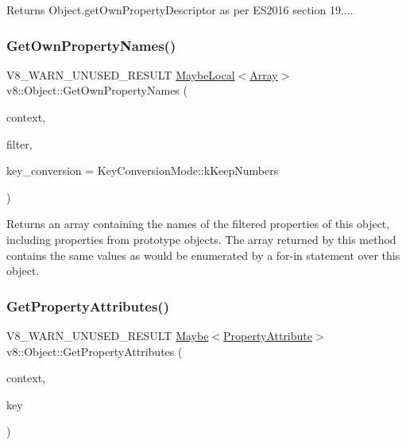 Returns Object.\+get\+Own\+Property\+Descriptor as per E\+S2016 section 19.... \mbox{\label{classv8_1_1Object_a345cc5b8e646c89bdf03b76f60544c91}} 
\subsubsection{\texorpdfstring{Get\+Own\+Property\+Names()}{GetOwnPropertyNames()}}
{\footnotesize\ttfamily V8\+\_\+\+W\+A\+R\+N\+\_\+\+U\+N\+U\+S\+E\+D\+\_\+\+R\+E\+S\+U\+LT \mbox{\hyperlink{classv8_1_1MaybeLocal}{Maybe\+Local}}$<$\mbox{\hyperlink{classv8_1_1Array}{Array}}$>$ v8\+::\+Object\+::\+Get\+Own\+Property\+Names (\begin{DoxyParamCaption}\item[{\mbox{\hyperlink{classv8_1_1Local}{Local}}$<$ \mbox{\hyperlink{classv8_1_1Context}{Context}} $>$}]{context,  }\item[{\mbox{\hyperlink{namespacev8_afbf02b6b1152a3e25d7bde90798209ac}{Property\+Filter}}}]{filter,  }\item[{\mbox{\hyperlink{namespacev8_aa65aeff871614520d8033dead4b34e38}{Key\+Conversion\+Mode}}}]{key\+\_\+conversion = {\ttfamily KeyConversionMode\+:\+:kKeepNumbers} }\end{DoxyParamCaption})}

Returns an array containing the names of the filtered properties of this object, including properties from prototype objects. The array returned by this method contains the same values as would be enumerated by a for-\/in statement over this object. \mbox{\label{classv8_1_1Object_ae5c97a596bcb634c50605a574358a9c6}} 
\subsubsection{\texorpdfstring{Get\+Property\+Attributes()}{GetPropertyAttributes()}}
{\footnotesize\ttfamily V8\+\_\+\+W\+A\+R\+N\+\_\+\+U\+N\+U\+S\+E\+D\+\_\+\+R\+E\+S\+U\+LT \mbox{\hyperlink{classv8_1_1Maybe}{Maybe}}$<$\mbox{\hyperlink{namespacev8_a05f25f935e108a1ea2d150e274602b87}{Property\+Attribute}}$>$ v8\+::\+Object\+::\+Get\+Property\+Attributes (\begin{DoxyParamCaption}\item[{\mbox{\hyperlink{classv8_1_1Local}{Local}}$<$ \mbox{\hyperlink{classv8_1_1Context}{Context}} $>$}]{context,  }\item[{\mbox{\hyperlink{classv8_1_1Local}{Local}}$<$ \mbox{\hyperlink{classv8_1_1Value}{Value}} $>$}]{key }\end{DoxyParamCaption})}

